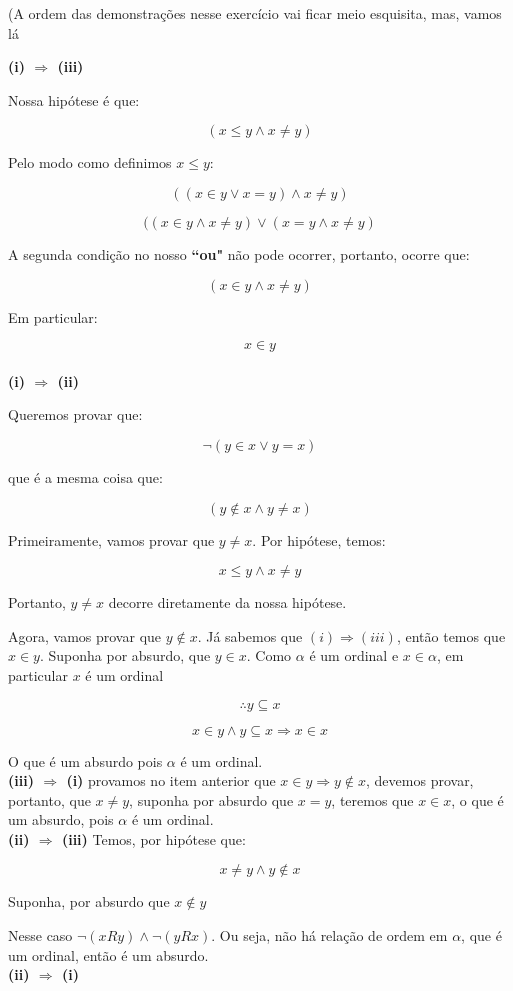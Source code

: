 \documentclass[12pt]{extarticle}
\newcommand{\asp}[1]{``#1"}
\begin{document}
(A ordem das demonstrações nesse exercício vai ficar meio esquisita, mas, vamos lá

\textbf{(i) $\Rightarrow$ (iii)}

Nossa hipótese é que:

$$
(x \leq y \land x \neq y)
$$

Pelo modo como definimos $x \leq y$:

$$
((x \in y \lor x = y) \land x \neq y)
$$

$$
((x \in y \land x \neq y) \lor (x = y \land x \neq y) 
$$

A segunda condição no nosso \textbf{\asp{ou}} não pode ocorrer, portanto, ocorre que:

$$
(x \in y \land x \neq y)
$$
 
 Em particular:
 
$$
x \in y
$$
\\
\textbf{(i) $\Rightarrow$ (ii)}

Queremos provar que:

$$
\neg (y \in x \lor y = x)
$$

que é a mesma coisa que:

$$
(y \notin x \land y \neq x)
$$

Primeiramente, vamos provar que $y \neq x$. Por hipótese, temos: 

$$
x \leq y \land x \neq y
$$

Portanto, $y \neq x$ decorre diretamente da nossa hipótese.

Agora, vamos provar que $y \notin x$. Já sabemos que $(i) \Rightarrow (iii)$, então temos que $x \in y$. Suponha por absurdo, que $y \in x$. Como $\alpha$ é um ordinal e $x \in \alpha$, em particular $x$ é um ordinal

$$
\therefore y \subseteq x 
$$

$$
x \in y \land y \subseteq x \Rightarrow x \in x
$$

O que é um absurdo pois $\alpha$ é um ordinal.
\\
\textbf{(iii) $\Rightarrow$ (i)}
provamos no item anterior que $x \in y \Rightarrow y \notin x$, devemos provar, portanto, que $x \neq y$, suponha por absurdo que $x = y$, teremos que $x \in x$, o que é um absurdo, pois $\alpha$ é um ordinal.
\\
\textbf{(ii) $\Rightarrow$ (iii)}
Temos, por hipótese que:

$$
x \neq y \land y \notin x
$$

Suponha, por absurdo que $x \notin y$

Nesse caso $\neg(xR y) \land \neg (y R x)$. Ou seja, não há relação de ordem em $\alpha$, que é um ordinal, então é um absurdo.
\\
\textbf{(ii) $\Rightarrow$ (i)}
\end{document}
